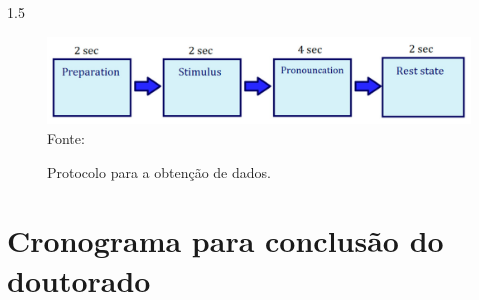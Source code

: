 \documentclass[a4paper,12pt,openright,oneside]{book}
\newenvironment{myenv}[1]
  {\begin{spacing}{#1}}
  {\end{spacing}}
\begin{document}
\begin{myenv}{1.5}
				\begin{figure}
					\centering
					\caption[Protocolo de obtenção]{Protocolo para a obtenção de dados.}
					\includegraphics[width=0.7\linewidth]{images/recordingProtocol}
					\\ Fonte: \cite{tamm2020classification}
					\label{fig:recordingprotocol}
				\end{figure}
		\end{myenv}

	\chapter{Cronograma para conclusão do doutorado}
		\label{ch:cronograma}
\end{document}
